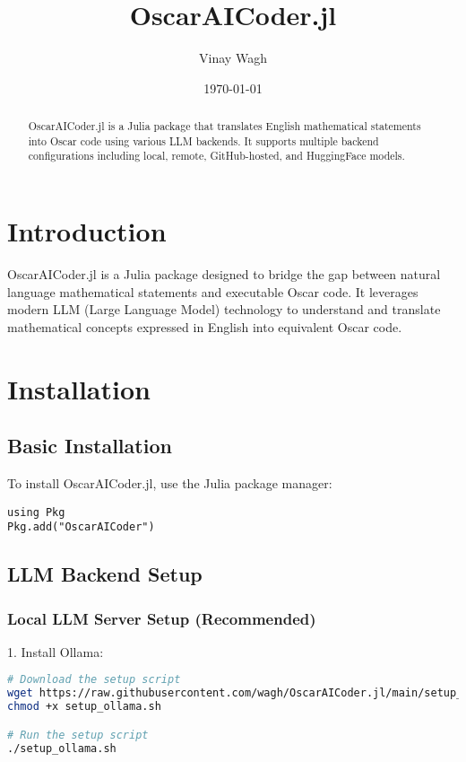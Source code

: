 \documentclass[11pt,a4paper]{article}
\title{\textbf{OscarAICoder.jl}}
\author{Vinay Wagh}
\date{\today}
\begin{document}
\maketitle

\begin{abstract}
OscarAICoder.jl is a Julia package that translates English mathematical statements into Oscar code using various LLM backends. It supports multiple backend configurations including local, remote, GitHub-hosted, and HuggingFace models.
\end{abstract}

\tableofcontents

\section{Introduction}

OscarAICoder.jl is a Julia package designed to bridge the gap between natural language mathematical statements and executable Oscar code. It leverages modern LLM (Large Language Model) technology to understand and translate mathematical concepts expressed in English into equivalent Oscar code.

\section{Installation}

\subsection{Basic Installation}
To install OscarAICoder.jl, use the Julia package manager:

\begin{lstlisting}
using Pkg
Pkg.add("OscarAICoder")
\end{lstlisting}

\subsection{LLM Backend Setup}

\subsubsection{Local LLM Server Setup (Recommended)}

1. Install Ollama:
\begin{lstlisting}[language=bash]
# Download the setup script
wget https://raw.githubusercontent.com/wagh/OscarAICoder.jl/main/setup_ollama.sh
chmod +x setup_ollama.sh

# Run the setup script
./setup_ollama.sh
\end{lstlisting}
\end{document}
